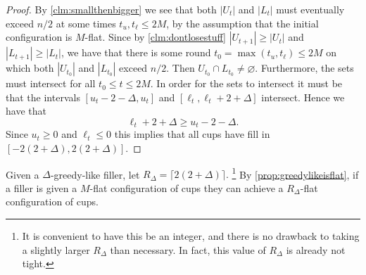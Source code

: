 \documentclass[twocolumn]{article}[10pt]
\begin{document}
\begin{proof}
  By \cref{clm:smallthenbigger} we see that both $|U_t|$ and $|L_t|$ must
  eventually exceed $n/2$ at some times $t_u, t_\ell \le 2M$, by the assumption
  that the initial configuration is $M$-flat. Since by
  \cref{clm:dontlosestuff} $|U_{t+1}|\ge |U_t|$ and $|L_{t+1}|
  \ge |L_t|$, we have that there is some round $t_0 =\max(t_u, t_\ell) \le 2M$ on which both
  $|U_{t_0}|$ and $|L_{t_0}|$ exceed $n/2$. Then $U_{t_0} \cap L_{t_0} \neq
  \varnothing$. Furthermore, the sets must intersect for all $t_0 \le t \le 2M$. 
  In order for the sets to intersect it must be that the intervals
  $[u_t-2-\Delta, u_t]$ and $[\ell_t, \ell_t+2+\Delta]$ intersect. Hence we have that 
  $$\ell_t+2+\Delta \ge u_t-2-\Delta.$$ Since $u_t \ge 0$ and $\ell_t \le 0$
  this implies that all cups have fill in $[-2(2+\Delta), 2(2+\Delta)]$.

\end{proof}

Given a $\Delta$-greedy-like filler, let $R_\Delta = \lceil 2(2+\Delta)
\rceil.$ \footnote{It is convenient to have this be an integer, and there is no
drawback to taking a slightly larger $R_\Delta$ than necessary. In fact, this
value of $R_\Delta$ is already not tight.}
By \cref{prop:greedylikeisflat}, if a filler is given a $M$-flat
configuration of cups they can achieve a $R_\Delta$-flat configuration of cups.
\end{document}
